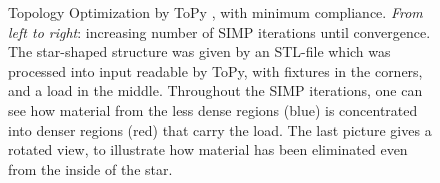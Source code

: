 \begin{figure}
\begin{subfigure}[c]{.2\linewidth}
\end{subfigure}
\caption{Topology Optimization by ToPy \cite{ToPy}, with minimum compliance. \emph{From left to right}: increasing number of SIMP iterations until convergence. The star-shaped structure was given by an STL-file which was processed into input readable by ToPy, with fixtures in the corners, and a load in the middle. Throughout the SIMP iterations, one can see how material from the less dense regions (blue) is concentrated into denser regions (red) that carry the load. The last picture gives a rotated view, to illustrate how material has been eliminated even from the inside of the star. } %
\label{fig: topyStar}
\end{figure}

